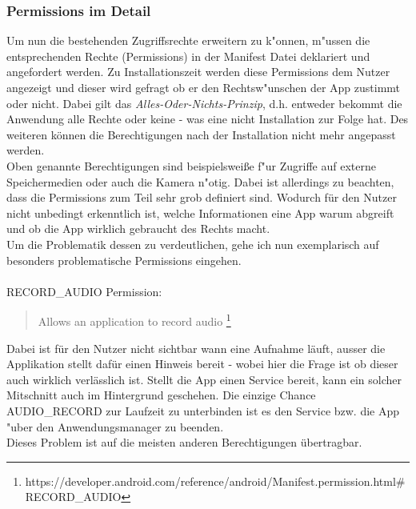 	\subsubsection{Permissions im Detail}
	Um nun die bestehenden Zugriffsrechte erweitern zu k"onnen, m"ussen die entsprechenden Rechte (Permissions) in der Manifest Datei deklariert und angefordert werden. Zu Installationszeit werden diese Permissions dem Nutzer angezeigt und dieser wird gefragt ob er den Rechtsw"unschen der App zustimmt oder nicht. Dabei gilt das \textit{Alles-Oder-Nichts-Prinzip}, d.h. entweder bekommt die Anwendung alle Rechte oder keine - was eine nicht Installation zur Folge hat. Des weiteren können die Berechtigungen nach der Installation nicht mehr angepasst werden.\\
	Oben genannte Berechtigungen sind beispielsweiße f"ur Zugriffe auf externe Speichermedien oder auch die Kamera n"otig. Dabei ist allerdings zu beachten, dass die Permissions zum Teil sehr grob definiert sind. Wodurch für den Nutzer nicht unbedingt erkenntlich ist, welche Informationen eine App warum abgreift und ob die App wirklich gebraucht des Rechts macht.\\
	Um die Problematik dessen zu verdeutlichen, gehe ich nun exemplarisch auf besonders problematische Permissions eingehen.\\\\
	RECORD\_AUDIO Permission:
	\begin{quote}
	Allows an application to record audio \footnote{https://developer.android.com/reference/android/Manifest.permission.html\#RECORD\_AUDIO}
	\end{quote}
	Dabei ist für den Nutzer nicht sichtbar wann eine Aufnahme läuft, ausser die Applikation stellt dafür einen Hinweis bereit - wobei hier die Frage ist ob dieser auch wirklich verlässlich ist. Stellt die App einen Service bereit, kann ein solcher Mitschnitt auch im Hintergrund geschehen. Die einzige Chance AUDIO\_RECORD zur Laufzeit zu unterbinden ist es den Service bzw. die App "uber den Anwendungsmanager zu beenden.\\
	Dieses Problem ist auf die meisten anderen Berechtigungen übertragbar.
	
	 
	
	

	